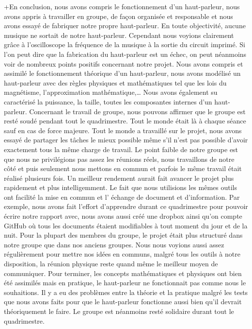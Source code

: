 

+En conclusion, nous avons compris le fonctionnement d’un haut-parleur, 
nous avons appris à travailler en groupe, de façon organisée et responsable
et nous avons essayé de fabriquer notre propre haut-parleur. 
En toute objectivité, aucune musique ne sortait de notre haut-parleur.  
Cependant nous voyions clairement grâce à l’oscilloscope la fréquence de 
la musique à la sortie du circuit imprimé.
Si l’on peut dire que la fabrication du haut-parleur est un échec, on peut
néanmoins voir de nombreux points positifs concernant notre projet.
Nous avons compris et assimilé le fonctionnement théorique d’un haut-parleur, 
nous avons modélisé un haut-parleur avec des règles physiques et mathématiques 
tel que les lois du magnétisme, l’approximation mathématique,…  Nous avons également
su caractérisé la puissance, la taille, toutes les composantes internes d’un haut-parleur. 
Concernant le travail de groupe, nous pouvons affirmer que le groupe est resté soudé
pendant tout le quadrimestre.  Tout le monde était là à chaque séance sauf en cas
de force majeure.  Tout le monde a travaillé sur le projet, nous avons essayé de
partager les tâches le mieux possible même s’il n’est pas possible d’avoir 
exactement tous la même charge de travail.  Le point faible de notre groupe est 
que nous ne privilégions pas assez les réunions réels, nous travaillons de notre 
côté et puis seulement nous mettons en commun et parfois le même travail était 
réalisé plusieurs fois.  Un meilleur rendement aurait fait avancer le projet plus 
rapidement et plus intelligemment. 
Le fait que nous utilisions les mêmes outils ont facilité la mise en commun et l’
échange de document et d’information. Par exemple, nous avons fait l’effort d’apprendre 
\latex{} durant ce quadrimestre pour pouvoir écrire notre rapport avec, nous avons aussi
créé une dropbox ainsi qu’on compte GitHub où tous les documents étaient modifiables à 
tout moment du jour et de la nuit.  Pour la plupart des membres du groupe, le projet était 
plus structuré dans notre groupe que dans nos anciens groupes.  Nous nous voyions aussi 
assez régulièrement pour mettre nos idées en communs, malgré tous les outils à notre 
disposition, la réunion physique reste quand même le meilleur moyen de communiquer.
Pour terminer, les concepts mathématiques et physiques ont bien été assimilés mais en 
pratique, le haut-parleur ne fonctionnait pas comme nous le souhaitions.  Il y a eu des
problèmes entre la théorie et la pratique malgré les tests que nous avons faits pour que 
le haut-parleur fonctionne aussi bien qu’il devrait théoriquement le faire.  Le groupe 
est néanmoins resté solidaire durant tout le quadrimestre.


